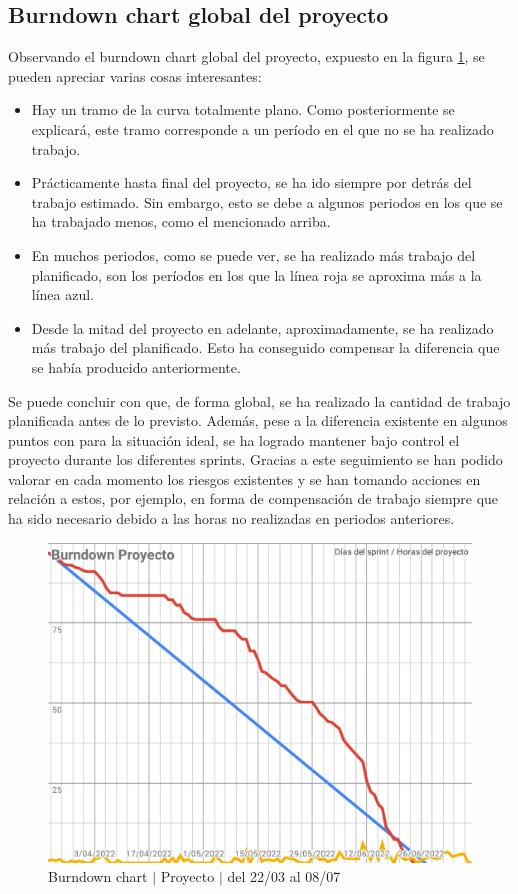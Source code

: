 \subsection{Burndown chart global del proyecto}
Observando el burndown chart global del proyecto, expuesto en la figura \ref{fig:burndown_chart_proyecto}, se pueden apreciar varias cosas interesantes:
\begin{itemize}
    \item Hay un tramo de la curva totalmente plano. Como posteriormente se explicará, este tramo corresponde a un período en el que no se ha realizado trabajo.
    \item Prácticamente hasta final del proyecto, se ha ido siempre por detrás del trabajo estimado. Sin embargo, esto se debe a algunos periodos en los que se ha trabajado menos, como el mencionado arriba. 
    \item En muchos periodos, como se puede ver, se ha realizado más trabajo del planificado, son los períodos en los que la línea roja se aproxima más a la línea azul.
    \item Desde la mitad del proyecto en adelante, aproximadamente, se ha realizado más trabajo del planificado. Esto ha conseguido compensar la diferencia que se había producido anteriormente.
\end{itemize}
Se puede concluir con que, de forma global, se ha realizado la cantidad de trabajo planificada antes de lo previsto. Además, pese a la diferencia existente en algunos puntos con para la situación ideal, se ha logrado mantener bajo control el proyecto durante los diferentes sprints. Gracias a este seguimiento se han podido valorar en cada momento los riesgos existentes y se han tomando acciones en relación a estos, por ejemplo, en forma de compensación de trabajo siempre que ha sido necesario debido a las horas no realizadas en periodos anteriores.

\begin{figure}[H]
    \centering
    \includegraphics[width=1\linewidth]{text/image/BurndownChartGlobal.pdf}
    \caption{Burndown chart $|$ Proyecto $|$ del 22/03 al 08/07}
    \label{fig:burndown_chart_proyecto}
\end{figure}


